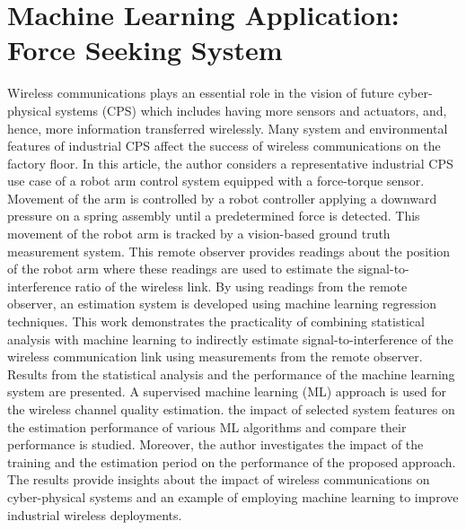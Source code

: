 
\chapter{Machine Learning Application: Force Seeking System}\label{chapter:ftml}

	
\chapterintro*
Wireless communications plays an essential role in the vision of future cyber-physical systems (CPS) which includes having more sensors and actuators, and, hence, more information transferred wirelessly. Many system and environmental features of industrial CPS affect the success of wireless communications on the factory floor. In this article, the author considers a representative industrial CPS use case of a robot arm control system equipped with a force-torque sensor. Movement of the arm is controlled by a robot controller applying a downward pressure on a spring assembly until a predetermined force is detected. This movement of the robot arm is tracked by a vision-based ground truth measurement system. This remote observer provides readings about the position of the robot arm where these readings are used to estimate the signal-to-interference ratio of the wireless link. By using readings from the remote observer, an estimation system is developed using machine learning regression techniques.  This work demonstrates the practicality of combining statistical analysis with machine learning to indirectly estimate signal-to-interference of the wireless communication link using measurements from the remote observer.  Results from the statistical analysis and the performance of the machine learning system are presented.  A supervised machine learning (ML) approach is used for the wireless channel quality estimation. the impact of selected system features on the estimation performance of various ML algorithms and compare their performance is studied.  Moreover, the author investigates the impact of the training and the estimation period on the performance of the proposed approach. The results provide insights about the impact of wireless communications on cyber-physical systems and an example of employing machine learning to improve industrial wireless deployments. 


	
